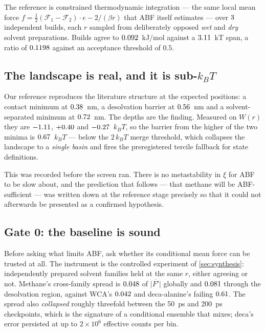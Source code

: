 The reference is constrained thermodynamic integration --- the same local mean force
$f = \tfrac12(\mathcal F_1 - \mathcal F_2)\cdot e - 2/(\beta r)$ that ABF itself estimates ---
over $3$ independent builds, each $r$ sampled from deliberately opposed \emph{wet} and
\emph{dry} solvent preparations. Builds agree to $\MeRefL2$~kJ/mol against a $3.11$~kT span,
a ratio of $0.1198$ against an acceptance threshold of $0.5$.

\subsection{The landscape is real, and it is sub-$k_BT$}

Our reference reproduces the literature structure at the expected positions: a contact minimum at
$0.38$~nm, a desolvation barrier at $0.56$~nm and a solvent-separated minimum at
$0.72$~nm. The depths are the finding. Measured on $W(r)$ they are $-1.11$,
$+0.40$ and $-0.27$~$k_BT$, so the barrier from the higher of the two minima is
$0.67$~$k_BT$ --- below the $2\,k_BT$ merge threshold, which collapses the landscape
to a \emph{single basin} and fires the preregistered tercile fallback for state definitions.

This was recorded before the screen ran. There is no metastability in $\xi$ for ABF to be slow
about, and the prediction that follows --- that methane will be ABF-sufficient --- was written
down at the reference stage precisely so that it could not afterwards be presented as a
confirmed hypothesis.

\subsection{Gate 0: the baseline is sound}

Before asking what limits ABF, ask whether its conditional mean force can be trusted at all. The
instrument is the controlled experiment of \cref{sec:synthesis}: independently prepared solvent
families held at the same $r$, either agreeing or not. Methane's cross-family spread is
$0.048$ of $\overline{|F'|}$ globally and $0.081$ through the desolvation
region, against WCA's $0.042$ and deca-alanine's failing $0.61$. The spread
also \emph{collapsed} roughly threefold between the 50~ps and 200~ps checkpoints, which is the
signature of a conditional ensemble that mixes; deca's error persisted at up to $2\times10^{6}$
effective counts per bin.

